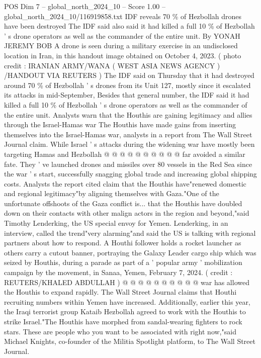 \begin{textsample}{POS Dim 7 – global\_north\_2024\_10 – Score 1.00 – global\_north\_2024\_10/116919858.txt}  \label{ex:f7_pos_419}
IDF reveals 70 \% of Hezbollah drones have been destroyed The IDF said also said it had killed a full 10 \% of Hezbollah ' s drone operators as well as the commander of the entire unit.
By YONAH JEREMY BOB A drone is seen during a military exercise in an undisclosed location in Iran, in this handout image obtained on October 4, 2023. ( photo credit : IRANIAN ARMY/WANA ( WEST ASIA NEWS AGENCY ) /HANDOUT VIA REUTERS ) The IDF said on Thursday that it had destroyed around 70 \% of Hezbollah ' s drones from its Unit 127, mostly since it escalated its attacks in mid-September, Besides that general number, the IDF said it had killed a full 10 \% of Hezbollah ' s drone operators as well as the commander of the entire unit.
Analysts warn that the Houthis are gaining legitimacy and allies through the Israel-Hamas war The Houthis have made gains from inserting themselves into the Israel-Hamas war, analysts in a report from The Wall Street Journal claim.
While Israel ' s attacks during the widening war have mostly been targeting Hamas and Hezbollah @ @ @ @ @ @ @ @ @ @ far avoided a similar fate.
They ' ve launched drones and missiles over 80 vessels in the Red Sea since the war ' s start, successfully snagging global trade and increasing global shipping costs.
Analysts the report cited claim that the Houthis have"renewed domestic and regional legitimacy"by aligning themselves with Gaza."One of the unfortunate offshoots of the Gaza conflict is... that the Houthis have doubled down on their contacts with other malign actors in the region and beyond,"said Timothy Lenderking, the US special envoy for Yemen.
Lenderking, in an interview, called the trend"very alarming"and said the US is talking with regional partners about how to respond.
A Houthi follower holds a rocket launcher as others carry a cutout banner, portraying the Galaxy Leader cargo ship which was seized by Houthis, during a parade as part of a ' popular army ' mobilization campaign by the movement, in Sanaa, Yemen, February 7, 2024. ( credit : REUTERS/KHALED ABDULLAH ) @ @ @ @ @ @ @ @ @ @ war has allowed the Houthis to expand rapidly.
The Wall Street Journal claims that Houthi recruiting numbers within Yemen have increased.
Additionally, earlier this year, the Iraqi terrorist group Kataib Hezbollah agreed to work with the Houthis to strike Israel."The Houthis have morphed from sandal-wearing fighters to rock stars.
These are people who you want to be associated with right now,"said Michael Knights, co-founder of the Militia Spotlight platform, to The Wall Street Journal.

\end{textsample}

